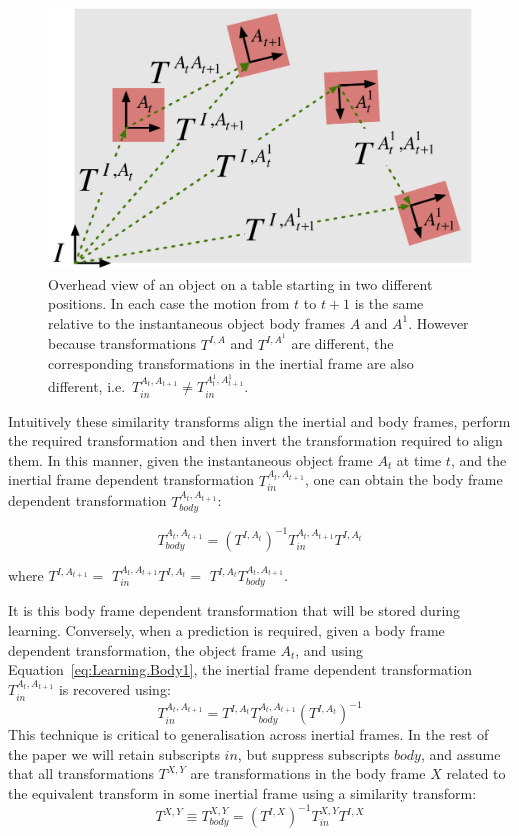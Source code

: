 \begin{figure}[b!]
\centerline{\includegraphics[width=0.9\columnwidth]{similarity-new}}
\caption[Similarity]{ Overhead view of an object on a table starting in two different positions. In each case the motion from $t$ to $t+1$ is the same relative to the instantaneous object body frames $A$ and $A^{1}$. However because transformations $T^{I, A}$ and $T^{I, A^{1}}$ are different, the corresponding transformations in the inertial frame are also different, i.e.\ $T_{in}^{A_{t}, A_{t+1}} \neq T_{in}^{A^{1}_{t}, A^{1}_{t+1}}$.}
\label{fig:similarity}
\end{figure}
Intuitively these similarity transforms align the inertial and body frames, perform the required transformation and then invert the transformation required to align them. In this manner, given the instantaneous object frame $A_{t}$ at time $t$, and the inertial frame dependent transformation
$T_{in}^{A_{t}, A_{t+1}}$, one can obtain the body frame dependent
transformation $T_{body}^{A_{t}, A_{t+1}}$:

\begin{equation}
T_{body}^{A_{t}, A_{t+1}} = (T^{I, A_{t}})^{-1} T_{in}^{A_{t}, A_{t+1}} T^{I, A_{t}}
\label{eq:Learning.Body1}
\end{equation}

\noindent where $T^{I, A_{t+1}} =$ $T_{in}^{A_{t}, A_{t+1}} T^{I, A_{t}} =$ $T^{I, A_{t}} T_{body}^{A_{t}, A_{t+1}}$.

It is this body frame dependent transformation that will be stored during learning. Conversely, when a prediction is required, given a body frame dependent transformation, the object
frame $A_{t}$, and using Equation~\eqref{eq:Learning.Body1}, the
inertial frame dependent transformation $T_{in}^{A_{t}, A_{t+1}}$ is
recovered using:
\begin{equation}
T_{in}^{A_{t}, A_{t+1}} = T^{I, A_{t}} T_{body}^{A_{t}, A_{t+1}} (T^{I, A_{t}})^{-1}
\label{eq:Learning.Body2}
\end{equation}
This technique is critical to generalisation across inertial frames. In the rest of the paper we will retain subscripts $in$, but suppress subscripts $body$, and assume that all transformations $T^{X, Y}$ are transformations in the body frame $X$ related to the equivalent transform in some inertial frame using a similarity transform:
\begin{equation}
T^{X, Y} \equiv T_{body}^{X, Y} = ({T^{I, X}})^{-1} T_{in}^{X, Y} {T^{I, X}}
\label{eq:Learning.Similarity}
\end{equation}


